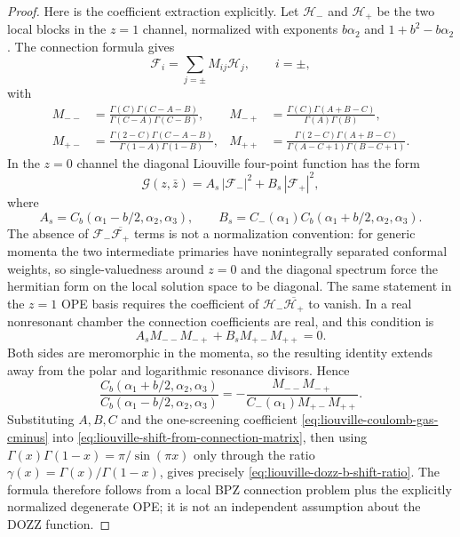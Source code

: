 \begin{proof}
Here is the coefficient extraction explicitly.  Let
\(\mathcal H_-\) and \(\mathcal H_+\) be the two local blocks in the
\(z=1\) channel, normalized with exponents \(b\alpha_2\) and
\(1+b^2-b\alpha_2\).  The connection formula gives
\[
  \mathcal F_i=\sum_{j=\pm} M_{ij}\mathcal H_j,
  \qquad i=\pm,
\]
with
\begin{align*}
  M_{--}
  &=
  \frac{\Gamma(C)\Gamma(C-A-B)}
       {\Gamma(C-A)\Gamma(C-B)},&
  M_{-+}
  &=
  \frac{\Gamma(C)\Gamma(A+B-C)}
       {\Gamma(A)\Gamma(B)},\\
  M_{+-}
  &=
  \frac{\Gamma(2-C)\Gamma(C-A-B)}
       {\Gamma(1-A)\Gamma(1-B)},&
  M_{++}
  &=
  \frac{\Gamma(2-C)\Gamma(A+B-C)}
       {\Gamma(A-C+1)\Gamma(B-C+1)} .
\end{align*}
In the \(z=0\) channel the diagonal Liouville four-point function has the
form
\[
  \mathcal G(z,\bar z)
  =
  A_s\,|\mathcal F_-|^2+B_s\,|\mathcal F_+|^2,
\]
where
\[
  A_s=C_b(\alpha_1-b/2,\alpha_2,\alpha_3),
  \qquad
  B_s=C_-(\alpha_1)C_b(\alpha_1+b/2,\alpha_2,\alpha_3).
\]
The absence of \(\mathcal F_-\overline{\mathcal F_+}\) terms is not a
normalization convention: for generic momenta the two intermediate primaries
have nonintegrally separated conformal weights, so single-valuedness around
\(z=0\) and the diagonal spectrum force the hermitian form on the local
solution space to be diagonal.  The same statement in the \(z=1\) OPE basis
requires the coefficient of
\(\mathcal H_-\overline{\mathcal H_+}\) to vanish.  In a real
nonresonant chamber the connection coefficients are real, and this condition
is
\[
  A_s M_{--}M_{-+}+B_s M_{+-}M_{++}=0.
\]
Both sides are meromorphic in the momenta, so the resulting identity extends
away from the polar and logarithmic resonance divisors.  Hence
\begin{equation}
  \frac{C_b(\alpha_1+b/2,\alpha_2,\alpha_3)}
       {C_b(\alpha_1-b/2,\alpha_2,\alpha_3)}
  =
  -\frac{M_{--}M_{-+}}
         {C_-(\alpha_1)M_{+-}M_{++}} .
  \label{eq:liouville-shift-from-connection-matrix}
\end{equation}
Substituting \(A,B,C\) and the one-screening coefficient
\eqref{eq:liouville-coulomb-gas-cminus} into
\eqref{eq:liouville-shift-from-connection-matrix}, then using
\(\Gamma(x)\Gamma(1-x)=\pi/\sin(\pi x)\) only through the ratio
\(\gamma(x)=\Gamma(x)/\Gamma(1-x)\), gives precisely
\eqref{eq:liouville-dozz-b-shift-ratio}.  The formula therefore follows
from a local BPZ connection problem plus the explicitly normalized
degenerate OPE; it is not an independent assumption about the DOZZ function.


\end{proof}
